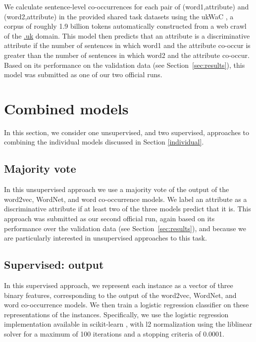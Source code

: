 \documentclass[11pt,a4paper]{article}
\newcommand{\secref}[1]{Section~\ref{#1}}
\begin{document}
We calculate sentence-level co-occurrences for each pair of
(word1,attribute) and (word2,attribute) in the provided shared task
datasets using the ukWaC \citep{Ferraresi2008}, a corpus of roughly
1.9 billion tokens automatically constructed from a web crawl of the
\url{.uk} domain. This model then predicts that an attribute is a
discriminative attribute if the number of sentences in which word1 and
the attribute co-occur is greater than the number of sentences in
which word2 and the attribute co-occur. Based on its performance on
the validation data (see \secref{sec:results}), this model was
submitted as one of our two official runs.

\section{Combined models\label{sec:combined}}

In this section, we consider one unsupervised, and two supervised,
approaches to combining the individual models discussed in Section
\ref{individual}.

\subsection{Majority vote}

In this unsupervised approach we use a majority vote of the output of
the word2vec, WordNet, and word co-occurrence models. We label an
attribute as a discriminative attribute if at least two of the three
models predict that it is. This approach was submitted as our second
official run, again based on its performance over the validation data
(see \secref{sec:results}), and because we are particularly interested
in unsupervised approaches to this task.

\subsection{Supervised: output\label{sec:supervised:output}}

In this supervised approach, we represent each instance as a vector of
three binary features, corresponding to the output of the word2vec,
WordNet, and word co-occurrence models. We then train a logistic
regression classifier on these representations of the
instances. Specifically, we use the logistic regression implementation
available in scikit-learn \citep{scikit-learn}, with l2 normalization
using the liblinear solver for a maximum of 100 iterations and a
stopping criteria of 0.0001.
\end{document}
